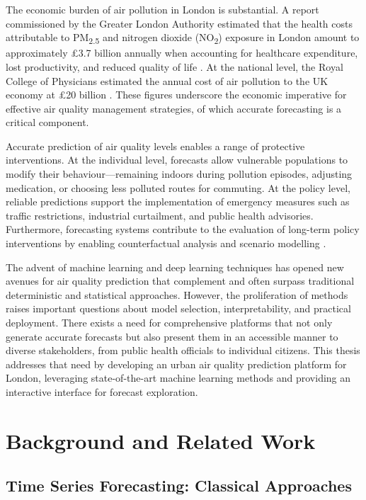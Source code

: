 The economic burden of air pollution in London is substantial. A report commissioned by the Greater London Authority estimated that the health costs attributable to PM\textsubscript{2.5} and nitrogen dioxide (NO\textsubscript{2}) exposure in London amount to approximately £3.7 billion annually when accounting for healthcare expenditure, lost productivity, and reduced quality of life \cite{phe2018estimation}. At the national level, the Royal College of Physicians estimated the annual cost of air pollution to the UK economy at £20 billion \cite{rcp2016every}. These figures underscore the economic imperative for effective air quality management strategies, of which accurate forecasting is a critical component.

Accurate prediction of air quality levels enables a range of protective interventions. At the individual level, forecasts allow vulnerable populations to modify their behaviour---remaining indoors during pollution episodes, adjusting medication, or choosing less polluted routes for commuting. At the policy level, reliable predictions support the implementation of emergency measures such as traffic restrictions, industrial curtailment, and public health advisories. Furthermore, forecasting systems contribute to the evaluation of long-term policy interventions by enabling counterfactual analysis and scenario modelling \cite{zhang2012real}.

The advent of machine learning and deep learning techniques has opened new avenues for air quality prediction that complement and often surpass traditional deterministic and statistical approaches. However, the proliferation of methods raises important questions about model selection, interpretability, and practical deployment. There exists a need for comprehensive platforms that not only generate accurate forecasts but also present them in an accessible manner to diverse stakeholders, from public health officials to individual citizens. This thesis addresses that need by developing an urban air quality prediction platform for London, leveraging state-of-the-art machine learning methods and providing an interactive interface for forecast exploration.

\section{Background and Related Work}
\label{sec:background}

\subsection{Time Series Forecasting: Classical Approaches}
\label{subsec:classical_ts}

